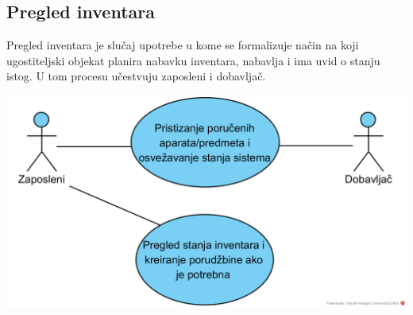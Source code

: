 \documentclass{article}
\begin{document}

\subsection{Pregled inventara}
Pregled inventara je slučaj upotrebe u kome se formalizuje način na koji ugostiteljski objekat planira nabavku inventara, nabavlja i ima uvid o stanju istog. U tom procesu učestvuju zaposleni i dobavljač. 

\includegraphics[width=\textwidth]{SU_2_pregled_inventara.png}
\end{document}
